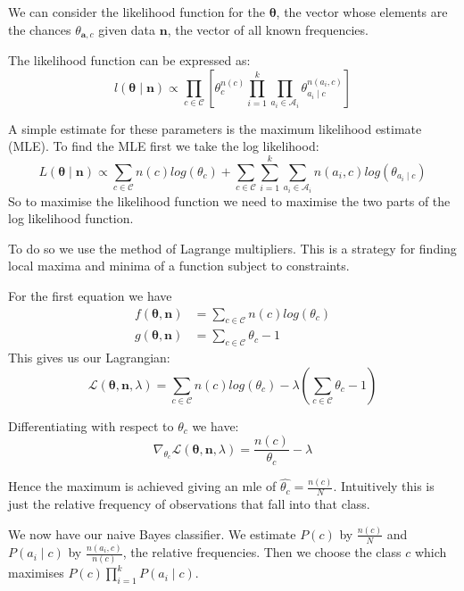 We can consider the likelihood function for the $\mathbf{\theta}$, the vector whose elements are the chances $\theta_{\mathbf{a}, c}$ given data $\mathbf{n}$, the vector of all known frequencies.

The likelihood function can be expressed as:
\begin{equation} \label{likelihood}
	l(\mathbf{\theta} \mid \mathbf{n}) \propto \prod_{c \in \mathcal{C}} \left[ \theta_c^{n(c)} \prod_{i=1}^k \prod_{a_i \in \mathcal{A}_i} \theta_{a_i \mid c}^{n(a_i, c)} \right]
\end{equation}

A simple estimate for these parameters is the maximum likelihood estimate (MLE).
To find the MLE first we take the log likelihood:
\begin{equation}
	L(\mathbf{\theta} \mid \mathbf{n}) \propto \sum_{c \in \mathcal{C}}  n(c)log(\theta_c) + \sum_{c \in \mathcal{C}} \sum_{i=1}^k \sum_{a_i \in \mathcal{A}_i} n(a_i, c) log(\theta_{a_i \mid c}) 
\end{equation}
So to maximise the likelihood function we need to maximise the two parts of the log likelihood function.

To do so we use the method of Lagrange multipliers.
This is a strategy for finding local maxima and minima of a function subject to constraints.

For the first equation we have
\begin{align}
	f(\mathbf{\theta}, \mathbf{n})& = \sum_{c \in \mathcal{C}}  n(c)log(\theta_c) \\
	g(\mathbf{\theta}, \mathbf{n})& = \sum_{c \in \mathcal{C}}  \theta_c - 1
\end{align}
This gives us our Lagrangian:
\begin{equation}
	\mathcal{L}(\mathbf{\theta}, \mathbf{n}, \lambda) = \sum_{c \in \mathcal{C}}  n(c)log(\theta_c) - \lambda(\sum_{c \in \mathcal{C}}  \theta_c - 1)
\end{equation}

Differentiating with respect to $\theta_c$ we have:
\begin{equation}
	\nabla_{\theta_c} \mathcal{L}(\mathbf{\theta}, \mathbf{n}, \lambda) = \frac{n(c)}{\theta_c} - \lambda
\end{equation}

Hence the maximum is achieved giving an mle of $\hat{\theta_c} = \frac{n(c)}{N}$.
Intuitively this is just the relative frequency of observations that fall into that class.

We now have our naive Bayes classifier.
We estimate $P(c)$ by $\frac{n(c)}{N}$ and $P(a_i \mid c)$ by $\frac{n(a_i, c)}{n(c)}$, the relative frequencies.
Then we choose the class $c$ which maximises $P(c)\prod_{i=1}^{k}P(a_i \mid c)$.

